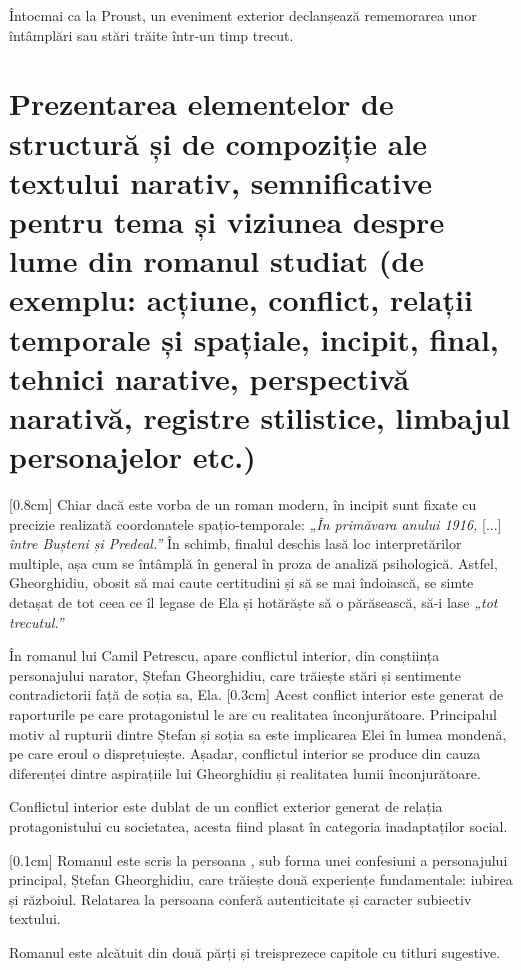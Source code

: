 Întocmai ca la Proust, un eveniment exterior declanșează rememorarea unor întâmplări sau stări trăite într-un timp trecut.


\section{Prezentarea elementelor de structură și de compoziție ale textului narativ, semnificative pentru tema și viziunea despre lume din romanul studiat {\footnotesize\normalfont(de exemplu: acțiune, conflict, relații temporale și spațiale, incipit, final, tehnici narative, perspectivă narativă, registre stilistice, limbajul personajelor etc.)}}

[0.8cm]
Chiar dacă este vorba de un roman modern, în incipit sunt fixate cu precizie realizată coordonatele spațio-temporale: \textit{„În primăvara anului 1916,} [...] \textit{între Bușteni și Predeal.”} În schimb, finalul deschis lasă loc interpretărilor multiple, așa cum se întâmplă în general în proza de analiză psihologică. Astfel, Gheorghidiu, obosit să mai caute certitudini și să se mai îndoiască, se simte detașat de tot ceea ce îl legase de Ela și hotărăște să o părăsească, să-i lase \textit{„tot trecutul.”}

În romanul lui Camil Petrescu, apare conflictul interior, din conștiința personajului narator, Ștefan Gheorghidiu, care trăiește stări și sentimente contradictorii față de soția sa, Ela.
[0.3cm]
Acest conflict interior este generat de raporturile pe care protagonistul le are cu realitatea înconjurătoare. Principalul motiv al rupturii dintre Ștefan și soția sa este implicarea Elei în lumea mondenă, pe care eroul o disprețuiește. Așadar, conflictul interior se produce din cauza diferenței dintre aspirațiile lui Gheorghidiu și realitatea lumii înconjurătoare.

Conflictul interior este dublat de un conflict exterior generat de relația protagonistului cu societatea, acesta fiind plasat în categoria inadaptaților social.

[0.1cm]
Romanul este scris la persoana , sub forma unei confesiuni a personajului principal, Ștefan Gheorghidiu, care trăiește două experiențe fundamentale: iubirea și războiul. Relatarea la persoana  conferă autenticitate și caracter subiectiv textului.

Romanul este alcătuit din două părți și treisprezece capitole cu titluri sugestive.

